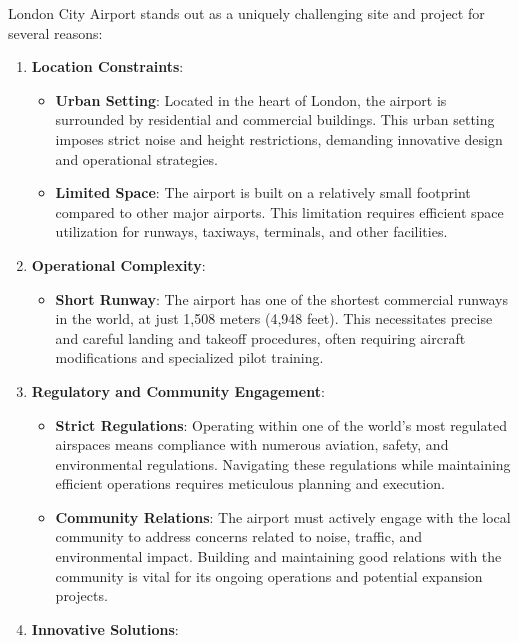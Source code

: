 \documentclass[
]{article}
\providecommand{\tightlist}{%
  \setlength{\itemsep}{0pt}\setlength{\parskip}{0pt}}\usepackage{longtable,booktabs,array}
\begin{document}
London City Airport stands out as a uniquely challenging site and
project for several reasons:

\begin{enumerate}
\def\labelenumi{\arabic{enumi}.}
\tightlist
\item
  \textbf{Location Constraints}:

  \begin{itemize}
  \tightlist
  \item
    \textbf{Urban Setting}: Located in the heart of London, the airport
    is surrounded by residential and commercial buildings. This urban
    setting imposes strict noise and height restrictions, demanding
    innovative design and operational strategies.
  \item
    \textbf{Limited Space}: The airport is built on a relatively small
    footprint compared to other major airports. This limitation requires
    efficient space utilization for runways, taxiways, terminals, and
    other facilities.
  \end{itemize}
\item
  \textbf{Operational Complexity}:

  \begin{itemize}
  \tightlist
  \item
    \textbf{Short Runway}: The airport has one of the shortest
    commercial runways in the world, at just 1,508 meters (4,948 feet).
    This necessitates precise and careful landing and takeoff
    procedures, often requiring aircraft modifications and specialized
    pilot training.
  \end{itemize}
\item
  \textbf{Regulatory and Community Engagement}:

  \begin{itemize}
  \tightlist
  \item
    \textbf{Strict Regulations}: Operating within one of the world's
    most regulated airspaces means compliance with numerous aviation,
    safety, and environmental regulations. Navigating these regulations
    while maintaining efficient operations requires meticulous planning
    and execution.
  \item
    \textbf{Community Relations}: The airport must actively engage with
    the local community to address concerns related to noise, traffic,
    and environmental impact. Building and maintaining good relations
    with the community is vital for its ongoing operations and potential
    expansion projects.
  \end{itemize}
\item
  \textbf{Innovative Solutions}:


\end{enumerate}
\end{document}
